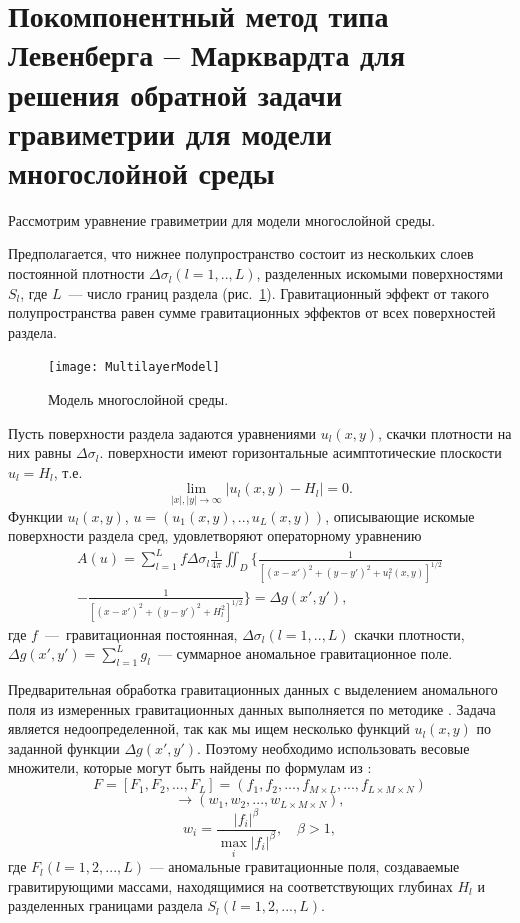 \newpage
\section{Покомпонентный метод типа Левенберга -- Марквардта для решения обратной задачи гравиметрии для модели многослойной среды}

Рассмотрим уравнение гравиметрии для модели многослойной среды. 

Предполагается, что нижнее полупространство состоит из нескольких слоев постоянной плотности $\Delta\sigma_l(l=1,..,L)$, разделенных искомыми поверхностями $S_l$, где $L$~--- число границ раздела (рис.~\ref{fig:multlayer}). Гравитационный эффект от такого полупространства равен сумме гравитационных эффектов от всех поверхностей раздела.
\begin{figure}
	\centering
	\texttt{[image: MultilayerModel]}
	\caption{Модель многослойной среды.}
	\label{fig:multlayer}
\end{figure}
Пусть поверхности раздела задаются уравнениями $u_l(x,y)$, скачки плотности на них равны $\Delta\sigma_l$. поверхности имеют горизонтальные асимптотические плоскости $u_l=H_l$, т.е. $$\lim_{|x|,|y|\to\infty}|u_l(x,y)-H_l|=0.$$ Функции $u_l(x,y)$, $u=(u_1(x,y), .., u_L(x,y))$, описывающие искомые поверхности раздела сред, удовлетворяют операторному уравнению
\begin{equation}\label{equ_grav}
\begin{aligned}
A(u)=\sum_{l=1}^{L}f\Delta\sigma_l\frac{1}{4\pi}\iint_D\bigg\{\frac{1}{[(x-x')^2+(y-y')^2+u_l^2(x,y)]^{1/2}} \\
-\frac{1}{[(x-x')^2+(y-y')^2+H_l^2]^{1/2}}\bigg\}=\Delta g(x',y'),
\end{aligned}
\end{equation}
где $f$~---~гравитационная постоянная, $\Delta\sigma_l(l=1,..,L)$ скачки плотности, $\Delta g(x',y')=\sum_{l=1}^{L}g_l$~--- суммарное аномальное гравитационное поле. 

Предварительная обработка гравитационных данных с выделением аномального поля из измеренных гравитационных данных выполняется по методике  \cite{MarPrut2003}. Задача является недоопределенной, так как мы ищем несколько функций $u_l(x,y)$ по заданной функции $\Delta g(x',y')$. Поэтому необходимо использовать весовые множители, которые могут быть найдены по формулам из \cite{AkMarMis2013}:
$$F=[F_1, F_2, ..., F_L]=(f_1, f_2, ..., f_{M\times L}, ..., f_{L\times M\times N})$$
$$\to (w_1, w_2, ..., w_{L\times M\times N}),$$
\begin{equation}\label{weght_fact_formula}
w_i=\frac{|f_i|^\beta}{\max\limits_{i} |f_i|^\beta}, \quad \beta>1,
\end{equation}
где $F_l (l=1, 2, ..., L)$ --- аномальные гравитационные поля, создаваемые гравитирующими массами, находящимися на соответствующих глубинах $H_l$ и разделенных границами раздела $S_l(l=1, 2, ..., L)$.

